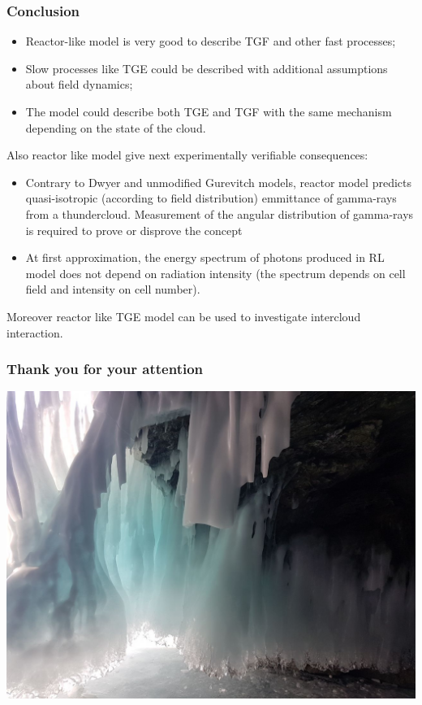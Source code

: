 \documentclass[8pt,pdf,hyperref={unicode}]{beamer}
\begin{document}
\begin{frame}
\frametitle{Conclusion}
{\large 				\begin{itemize}
	\item Reactor-like model is very good to describe TGF and other fast processes;
	\item Slow processes like TGE could be described with additional assumptions about field dynamics;
	\item The model could describe both TGE and TGF with the same mechanism depending on the state of the cloud.
\end{itemize}
Also reactor like model give next experimentally verifiable consequences:
\begin{itemize}
	\item Contrary to Dwyer and unmodified Gurevitch models, reactor model predicts quasi-isotropic (according to field distribution) emmittance of gamma-rays from a thundercloud. Measurement of the angular distribution of gamma-rays is required to prove or disprove the concept
	
	\item At first approximation, the energy spectrum of photons produced in RL model does not depend on radiation intensity (the spectrum depends on cell field and intensity on cell number).
\end{itemize}
Moreover reactor like TGE model can be used to investigate intercloud interaction.}
\end{frame}

\begin{frame}
\frametitle{Thank you for your attention}
\centering\includegraphics[width=0.8\paperwidth]{end.jpg}
\end{frame}
\end{document}
